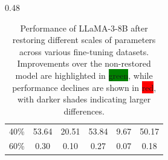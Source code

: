 \begin{table}[!t]
\begin{subtable}[!t]{0.48\linewidth}
{\begin{tabular}{lccccc}
    40\% & \cellcolor{GREEN!42}53.64 & \cellcolor{RED!32}20.51 & \cellcolor{RED!1}53.84 & \cellcolor{RED!44}9.67 & \cellcolor{RED!1}50.17 \\
    60\% & \cellcolor{RED!49}0.30 & \cellcolor{RED!53}0.10 & \cellcolor{RED!54}0.27 & \cellcolor{RED!53}0.07 & \cellcolor{RED!51}0.18 \\\bottomrule
    \end{tabular}
    }
    \caption{Out-of-Domain ($\textbf{Acc}_{testood}^\mathcal{M}$)}
    \end{subtable}
    \caption{Performance of LLaMA-3-8B after restoring different scales of parameters across various fine-tuning datasets. Improvements over the non-restored model are highlighted in \colorbox{GREEN}{green}, while performance declines are shown in \colorbox{RED}{red}, with darker shades indicating larger differences.}
    \label{tab:restore}
\end{table}


